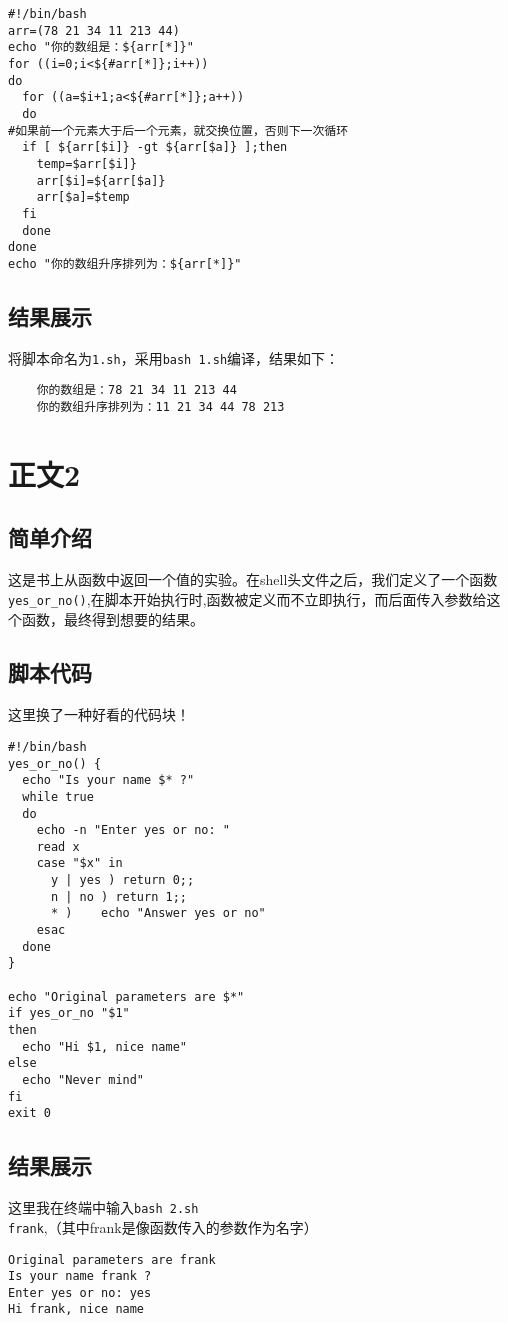 \documentclass{ctexart}
\begin{document}
\begin{verbatim}
#!/bin/bash
arr=(78 21 34 11 213 44)
echo "你的数组是：${arr[*]}"
for ((i=0;i<${#arr[*]};i++))
do
  for ((a=$i+1;a<${#arr[*]};a++))
  do
#如果前一个元素大于后一个元素，就交换位置，否则下一次循环
  if [ ${arr[$i]} -gt ${arr[$a]} ];then
    temp=$arr[$i]}
    arr[$i]=${arr[$a]}
    arr[$a]=$temp
  fi
  done
done
echo "你的数组升序排列为：${arr[*]}"
\end{verbatim}

\subsection{结果展示}
将脚本命名为\verb|1.sh|，采用\verb|bash 1.sh|编译，结果如下：
\begin{verbatim}
    你的数组是：78 21 34 11 213 44
    你的数组升序排列为：11 21 34 44 78 213
\end{verbatim}
\newpage
\vspace{-0.2cm}
\section{正文2}
\subsection{简单介绍}
这是书上从函数中返回一个值的实验。在shell头文件之后，我们定义了一个函数\verb|yes_or_no()|,在脚本开始执行时,函数被定义而不立即执行，而后面传入参数给这个函数，最终得到想要的结果。
\subsection{脚本代码}
这里换了一种好看的代码块！
\begin{lstlisting}
#!/bin/bash
yes_or_no() {
  echo "Is your name $* ?"
  while true
  do
    echo -n "Enter yes or no: "
    read x
    case "$x" in
      y | yes ) return 0;;
      n | no ) return 1;;
      * )    echo "Answer yes or no"
    esac
  done
}

echo "Original parameters are $*"
if yes_or_no "$1"
then 
  echo "Hi $1, nice name"
else
  echo "Never mind"
fi
exit 0
\end{lstlisting}

\subsection{结果展示}
这里我在终端中输入\verb|bash 2.sh frank|,（其中frank是像函数传入的参数作为名字）
\begin{verbatim}
Original parameters are frank
Is your name frank ?
Enter yes or no: yes
Hi frank, nice name
\end{verbatim}
\end{document}
